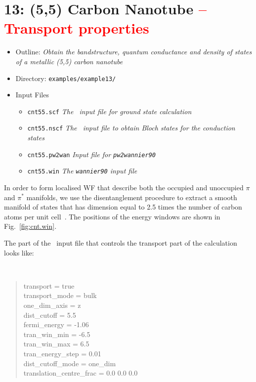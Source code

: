 \documentclass[a4paper,11pt,twoside]{article}
\def\tent#1{\textcolor{red}{#1}}     %
\begin{document}
\cleardoublepage

\section*{13: (5,5) Carbon Nanotube \tent{-- Transport properties}}

\begin{itemize}
  \item{Outline: \it{Obtain the bandstructure, quantum conductance and
  density of states of a metallic (5,5) carbon nanotube}}
  \item{Directory: {\tt examples/example13/}}
  \item{Input Files}
    \begin{itemize}
      \item{ {\tt cnt55.scf}  {\it The \pwscf\ input file for ground state
	  calculation}}
      \item{ {\tt cnt55.nscf}  {\it The \pwscf\ input file to obtain Bloch
	  states for the conduction states}} 
      \item{ {\tt cnt55.pw2wan}  {\it Input file for {\tt pw2wannier90}}}
      \item{ {\tt cnt55.win}  {\it The {\tt wannier90} input file}}
    \end{itemize}
\end{itemize}

In order to form localised WF that describe both the occupied and
unoccupied $\pi$ and $\pi^{\ast}$ manifolds, we use the
disentanglement procedure to extract a smooth manifold of states that
has dimension equal to 2.5 times the number of carbon atoms per unit
cell~\cite{WanTran}. The positions of the energy windows are shown in
Fig.~\ref{fig:cnt.win}.

The part of the \wannier\ input file that controls the transport part
of the calculation looks like:

{\tt
\begin{quote}
transport                 = true\\
transport\_mode           = bulk\\
one\_dim\_axis            = z\\
dist\_cutoff              =  5.5\\
fermi\_energy             = -1.06\\
tran\_win\_min            = -6.5\\
tran\_win\_max            = 6.5\\
tran\_energy\_step         = 0.01\\
dist\_cutoff\_mode        = one\_dim\\
translation\_centre\_frac = 0.0 0.0 0.0
\end{quote} }
\end{document}
